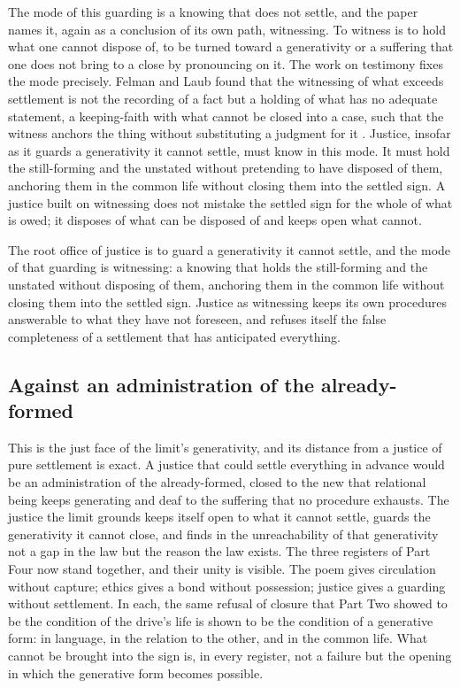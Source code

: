 The mode of this guarding is a knowing that does not settle, and the paper names it, again as a conclusion of its own path, witnessing. To witness is to hold what one cannot dispose of, to be turned toward a generativity or a suffering that one does not bring to a close by pronouncing on it. The work on testimony fixes the mode precisely. Felman and Laub found that the witnessing of what exceeds settlement is not the recording of a fact but a holding of what has no adequate statement, a keeping-faith with what cannot be closed into a case, such that the witness anchors the thing without substituting a judgment for it \parencite{felman1992testimony}. Justice, insofar as it guards a generativity it cannot settle, must know in this mode. It must hold the still-forming and the unstated without pretending to have disposed of them, anchoring them in the common life without closing them into the settled sign. A justice built on witnessing does not mistake the settled sign for the whole of what is owed; it disposes of what can be disposed of and keeps open what cannot.

\begin{claim}
The root office of justice is to guard a generativity it cannot settle, and the mode of that guarding is witnessing: a knowing that holds the still-forming and the unstated without disposing of them, anchoring them in the common life without closing them into the settled sign. Justice as witnessing keeps its own procedures answerable to what they have not foreseen, and refuses itself the false completeness of a settlement that has anticipated everything.
\end{claim}

\subsection*{Against an administration of the already-formed}

This is the just face of the limit's generativity, and its distance from a justice of pure settlement is exact. A justice that could settle everything in advance would be an administration of the already-formed, closed to the new that relational being keeps generating and deaf to the suffering that no procedure exhausts. The justice the limit grounds keeps itself open to what it cannot settle, guards the generativity it cannot close, and finds in the unreachability of that generativity not a gap in the law but the reason the law exists. The three registers of Part Four now stand together, and their unity is visible. The poem gives circulation without capture; ethics gives a bond without possession; justice gives a guarding without settlement. In each, the same refusal of closure that Part Two showed to be the condition of the drive's life is shown to be the condition of a generative form: in language, in the relation to the other, and in the common life. What cannot be brought into the sign is, in every register, not a failure but the opening in which the generative form becomes possible.
